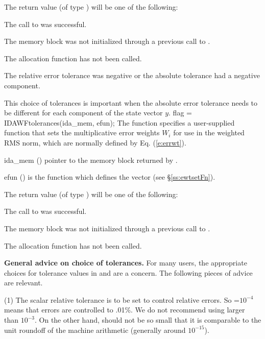 {
  The return value  (of type ) will be one of the following:
  \begin{args}
  \item[\Id{IDA\_SUCCESS}]
    The call to  was successful.
  \item[\Id{IDA\_MEM\_NULL}]
    The {\ida} memory block was not initialized through a previous call to
    .
  \item[\Id{IDA\_NO\_MALLOC}]
    The allocation function  has not been called.
  \item[\Id{IDA\_ILL\_INPUT}]
    The relative error tolerance was negative or the absolute tolerance
    had a negative component.
  \end{args}
}
{
  This choice of tolerances is important when the absolute error tolerance needs to
  be different for each component of the state vector $y$.
}
{
  flag = IDAWFtolerances(ida\_mem, efun);
}
{
  The function  specifies a user-supplied function 
  that sets the multiplicative error weights $W_i$ for use in the weighted
  RMS norm, which are normally defined by Eq. (\ref{e:errwt}).
}
{
  \begin{args}
  \item[ida\_mem] ()
    pointer to the {\ida} memory block returned by .
  \item[efun] ()
    is the {\CC} function which defines the  vector (see
    \S\ref{ss:ewtsetFn}).
  \end{args}
}
{
  The return value  (of type ) will be one of the following:
  \begin{args}
  \item[\Id{IDA\_SUCCESS}]
    The call to  was successful.
  \item[\Id{IDA\_MEM\_NULL}]
    The {\ida} memory block was not initialized through a previous call to
    .
  \item[\Id{IDA\_NO\_MALLOC}]
    The allocation function  has not been called.
  \end{args}
}
{}

{\bf General advice on choice of tolerances.}
For many users, the appropriate choices for tolerance values in
 and  are a concern.  The following pieces of
advice are relevant.

(1) The scalar relative tolerance  is to be set to control relative
errors.  So =$10^{-4}$ means that errors are controlled to .01\%.  We
do not recommend using  larger than $10^{-3}$.  On the other hand,
 should not be so small that it is comparable to the unit roundoff
of the machine arithmetic (generally around $10^{-15}$).

